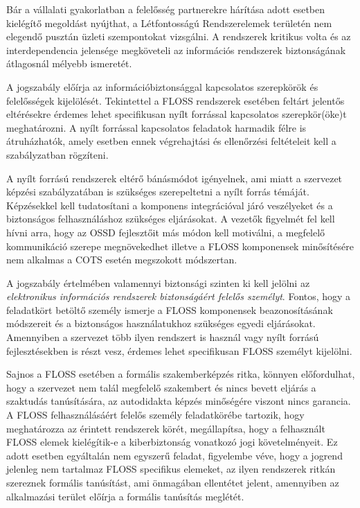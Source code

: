 \documentclass[12pt,magyar,a4paper,oneside]{scrreprt}
\begin{document}
Bár a vállalati gyakorlatban a felelősség partnerekre hárítása adott
esetben kielégítő megoldást nyújthat, a Létfontosságú Rendszerelemek
területén nem elegendő pusztán üzleti szempontokat vizsgálni. A
rendszerek kritikus volta és az interdependencia jelensége megköveteli
az információs rendszerek biztonságának átlagosnál mélyebb ismeretét.

A jogszabály előírja az információbiztonsággal kapcsolatos szerepkörök
és felelősségek kijelölését. Tekintettel a FLOSS rendszerek esetében
feltárt jelentős eltérésekre érdemes lehet specifikusan nyílt forrással
kapcsolatos szerepkör(öke)t meghatározni. A nyílt forrással kapcsolatos
feladatok harmadik félre is átruházhatók, amely esetben ennek
végrehajtási és ellenőrzési feltételeit kell a szabályzatban rögzíteni.

A nyílt forrású rendszerek eltérő bánásmódot igényelnek, ami miatt a
szervezet képzési szabályzatában is szükséges szerepeltetni a nyílt
forrás témáját. Képzésekkel kell tudatosítani a komponens integrációval
járó veszélyeket és a biztonságos felhasználáshoz szükséges eljárásokat.
A vezetők figyelmét fel kell hívni arra, hogy az OSSD fejlesztőit más
módon kell motiválni, a megfelelő kommunikáció szerepe megnövekedhet
illetve a FLOSS komponensek minősítésére nem alkalmas a COTS esetén
megszokott módszertan.

A jogszabály értelmében valamennyi biztonsági szinten ki kell jelölni az
\emph{elektronikus információs rendszerek biztonságáért felelős
személyt}. Fontos, hogy a feladatkört betöltő személy ismerje a FLOSS
komponensek beazonosításának módszereit és a biztonságos használatukhoz
szükséges egyedi eljárásokat. Amennyiben a szervezet több ilyen
rendszert is használ vagy nyílt forrású fejlesztésekben is részt vesz,
érdemes lehet specifikusan FLOSS személyt kijelölni.

Sajnos a FLOSS esetében a formális szakemberképzés ritka, könnyen
előfordulhat, hogy a szervezet nem talál megfelelő szakembert és nincs
bevett eljárás a szaktudás tanúsítására, az autodidakta képzés
minőségére viszont nincs garancia. A FLOSS felhasználásáért felelős
személy feladatkörébe tartozik, hogy meghatározza az érintett rendszerek
körét, megállapítsa, hogy a felhasznált FLOSS elemek kielégítik-e a
kiberbiztonság vonatkozó jogi követelményeit. Ez adott esetben
egyáltalán nem egyszerű feladat, figyelembe véve, hogy a jogrend
jelenleg nem tartalmaz FLOSS specifikus elemeket, az ilyen rendszerek
ritkán szereznek formális tanúsítást, ami önmagában ellentétet jelent,
amennyiben az alkalmazási terület előírja a formális tanúsítás meglétét.
\end{document}
